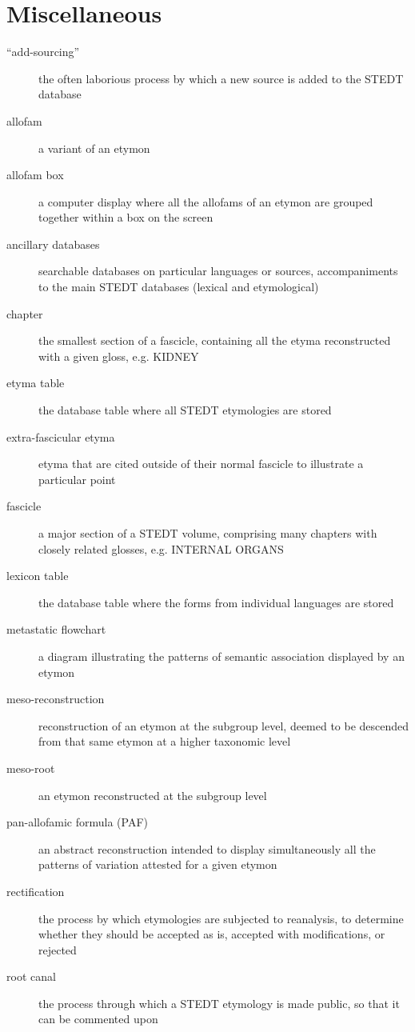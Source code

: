 \section*{Miscellaneous}
\begin{multicols}{2}
\begin{description}
\item[“add-sourcing”]	the often laborious process by which a new source is added to the STEDT database
\item[allofam]	a variant of an etymon
\item[allofam box]	a computer display where all the allofams of an etymon are grouped together within a box on the screen
\item[ancillary databases]	searchable databases on particular languages or sources, accompaniments to the main STEDT databases (lexical and etymological)
\item[chapter]	the smallest section of a fascicle, containing all the etyma reconstructed with a given gloss, e.g. KIDNEY
\item[etyma table]	the database table where all STEDT etymologies are stored
\item[extra-fascicular etyma]	etyma that are cited outside of their normal fascicle to illustrate a particular point
\item[fascicle]	a major section of a STEDT volume, comprising many chapters with closely related glosses, e.g. INTERNAL ORGANS
\item[lexicon table]	the database table where the forms from individual languages are stored
\item[metastatic flowchart]	a diagram illustrating the patterns of semantic association displayed by an etymon
\item[meso-reconstruction]	reconstruction of an etymon at the subgroup level, deemed to be descended from that same etymon at a higher taxonomic level
\item[meso-root]	an etymon reconstructed at the subgroup level
\item[pan-allofamic formula (PAF)]	an abstract reconstruction intended to display simultaneously all the patterns of variation attested for a given etymon
\item[rectification]	the process by which etymologies are subjected to reanalysis, to determine whether they should be accepted as is, accepted with modifications, or rejected
\item[root canal]	the process through which a STEDT etymology is made public, so that it can be commented upon 

\end{description}
\end{multicols}
